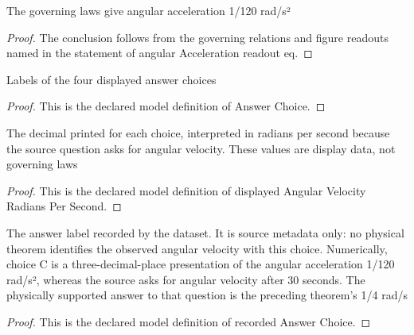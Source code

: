 \begin{lemma}
  \label{lem:physics:phyx-mini-0703:phyxminiproblems-problemphyxmini0703-angularacceleration-readout-eq}
  The governing laws give angular acceleration 1/120 rad/s²
\end{lemma}
\begin{proof}
  The conclusion follows from the governing relations and figure readouts named in the statement of angular Acceleration readout eq.
\end{proof}
\begin{definition}
  \label{def:physics:phyx-mini-0703:phyxminiproblems-problemphyxmini0703-answerchoice}
  Labels of the four displayed answer choices
\end{definition}
\begin{proof}
  This is the declared model definition of Answer Choice.
\end{proof}
\begin{definition}
  \label{def:physics:phyx-mini-0703:phyxminiproblems-problemphyxmini0703-displayedangularvelocityradianspersecond}
  The decimal printed for each choice, interpreted in radians per second because the source question asks for angular velocity. These values are display data, not governing laws
\end{definition}
\begin{proof}
  This is the declared model definition of displayed Angular Velocity Radians Per Second.
\end{proof}
\begin{definition}
  \label{def:physics:phyx-mini-0703:phyxminiproblems-problemphyxmini0703-recordedanswerchoice}
  The answer label recorded by the dataset. It is source metadata only: no physical theorem identifies the observed angular velocity with this choice. Numerically, choice C is a three-decimal-place presentation of the angular acceleration 1/120 rad/s², whereas the source asks for angular velocity after 30 seconds. The physically supported answer to that question is the preceding theorem's 1/4 rad/s
\end{definition}
\begin{proof}
  This is the declared model definition of recorded Answer Choice.
\end{proof}
